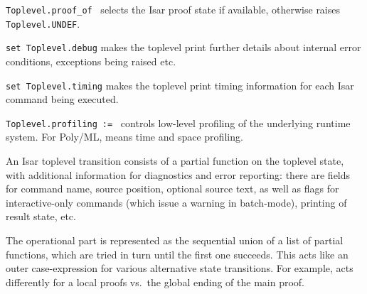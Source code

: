 \begin{isabellebody}
\begin{isamarkuptext}
\begin{description}
  \item \verb|Toplevel.proof_of|~ selects the Isar proof
  state if available, otherwise raises \verb|Toplevel.UNDEF|.

  \item \verb|set Toplevel.debug| makes the toplevel print further
  details about internal error conditions, exceptions being raised
  etc.

  \item \verb|set Toplevel.timing| makes the toplevel print timing
  information for each Isar command being executed.

  \item \verb|Toplevel.profiling|~\verb|:=|~ controls
  low-level profiling of the underlying {\ML} runtime system.  For
  Poly/ML,  means time and  space
  profiling.

  \end{description}%
\end{isamarkuptext}%
\isamarkuptrue%
%
\endisatagmlref
{\isafoldmlref}%
%
\isadelimmlref
%
\endisadelimmlref
%
\isamarkuptrue%
%
\begin{isamarkuptext}%
An Isar toplevel transition consists of a partial function on the
  toplevel state, with additional information for diagnostics and
  error reporting: there are fields for command name, source position,
  optional source text, as well as flags for interactive-only commands
  (which issue a warning in batch-mode), printing of result state,
  etc.

  The operational part is represented as the sequential union of a
  list of partial functions, which are tried in turn until the first
  one succeeds.  This acts like an outer case-expression for various
  alternative state transitions.  For example,  acts
  differently for a local proofs vs.\ the global ending of the main
  proof.


\end{isamarkuptext}
\end{isabellebody}
